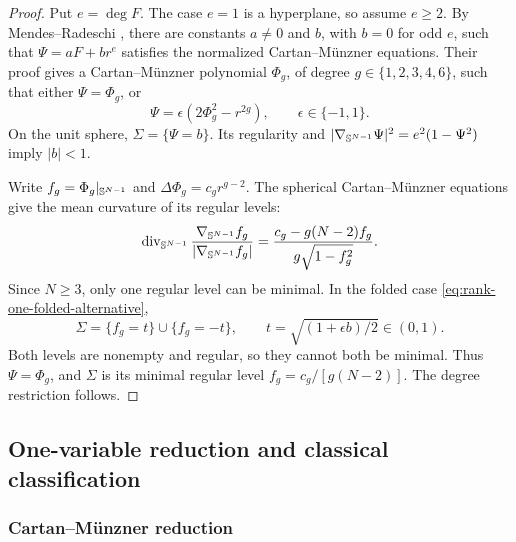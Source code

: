 \begin{proof}
Put \(e=\deg F\). The case \(e=1\) is a hyperplane, so assume
\(e\geq2\). By Mendes--Radeschi
\cite[Proposition~37(c) and its proof]{MendesRadeschi}, there are
constants \(a\neq0\) and \(b\), with \(b=0\) for odd \(e\), such
that \(\Psi=aF+br^e\) satisfies the normalized Cartan--M\"unzner
equations. Their proof gives a Cartan--M\"unzner polynomial
\(\Phi_g\), of degree \(g\in\{1,2,3,4,6\}\), such that either
\(\Psi=\Phi_g\), or
\begin{equation}\label{eq:rank-one-folded-alternative}
 \Psi=\epsilon(2\Phi_g^2-r^{2g}),\qquad \epsilon\in\{-1,1\}.
\end{equation}
On the unit sphere, \(\Sigma=\{\Psi=b\}\). Its regularity and
\(|\nabla_{\mathbb S^{N-1}}\Psi|^2=e^2(1-\Psi^2)\) imply \(|b|<1\).

Write \(f_g=\Phi_g|_{\mathbb S^{N-1}}\) and
\(\Delta\Phi_g=c_g r^{g-2}\). The spherical Cartan--M\"unzner
equations give the mean curvature of its regular levels:
\begin{equation}\label{eq:rank-one-level-mean-curvature}
 \operatorname{div}_{\mathbb S^{N-1}}
 \frac{\nabla_{\mathbb S^{N-1}}f_g}{|\nabla_{\mathbb S^{N-1}}f_g|}
 =\frac{c_g-g(N-2)f_g}{g\sqrt{1-f_g^2}}.
\end{equation}
Since \(N\geq3\), only one regular level can be minimal.
In the folded case \eqref{eq:rank-one-folded-alternative},
\[
 \Sigma=\{f_g=t\}\cup\{f_g=-t\},\qquad
 t=\sqrt{(1+\epsilon b)/2}\in(0,1).
\]
Both levels are nonempty and regular, so they cannot both be minimal.
Thus \(\Psi=\Phi_g\), and \(\Sigma\) is its minimal regular level
\(f_g=c_g/[g(N-2)]\). The degree restriction follows.
\end{proof}

\subsection{One-variable reduction and classical classification}
\label{sec:isoparametric-reduction}

\subsubsection{Cartan--M\"unzner reduction}

